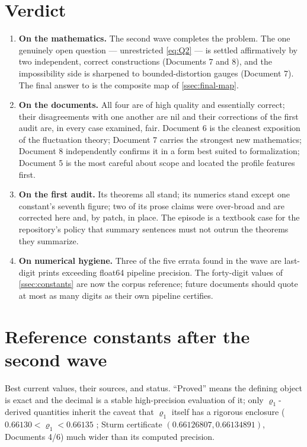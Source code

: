 \documentclass[11pt,oneside]{article}
\theoremstyle{definition}
\theoremstyle{remark}
\begin{document}
\section{Verdict}
\label{sec:verdict}

\begin{enumerate}
\item \textbf{On the mathematics.}  The second wave completes the
problem.  The one genuinely open question --- unrestricted
\eqref{eq:Q2} --- is settled affirmatively by two independent, correct
constructions (Documents 7 and 8), and the impossibility side is
sharpened to bounded-distortion gauges (Document 7).  The final answer
to \cite{mse-decay} is the composite map of \cref{ssec:final-map}.
\item \textbf{On the documents.}  All four are of high quality and
essentially correct; their disagreements with one another are nil and
their corrections of the first audit are, in every case examined, fair.
Document 6 is the cleanest exposition of the fluctuation theory;
Document 7 carries the strongest new mathematics; Document 8
independently confirms it in a form best suited to formalization;
Document 5 is the most careful about scope and located the profile
features first.
\item \textbf{On the first audit.}  Its theorems all stand; its
numerics stand except one constant's seventh figure; two of its prose
claims were over-broad and are corrected here and, by patch, in place.
The episode is a textbook case for the repository's policy that
summary sentences must not outrun the theorems they summarize.
\item \textbf{On numerical hygiene.}  Three of the five errata found in
the wave are last-digit prints exceeding float64 pipeline precision.
The forty-digit values of \cref{ssec:constants} are now the corpus
reference; future documents should quote at most as many digits as
their own pipeline certifies.
\end{enumerate}

\appendix

\section{Reference constants after the second wave}
\label{app:constants}

Best current values, their sources, and status.  ``Proved'' means the
defining object is exact and the decimal is a stable high-precision
evaluation of it; only $\varrho_1$-derived quantities inherit the
caveat that $\varrho_1$ itself has a rigorous enclosure
($0.66130<\varrho_1<0.66135$ \cite{ahl2017}; Sturm certificate
$(0.66126807,0.66134891)$, Documents 4/6) much wider than its computed
precision.
\end{document}
